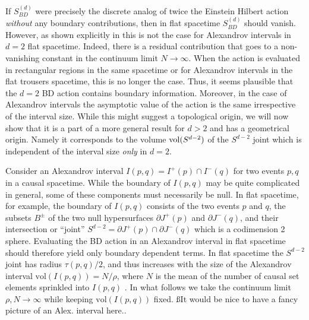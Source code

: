 \documentclass[12pt]{article}
\begin{document}
If $S_{BD}^{ (d)}$ were precisely the discrete analog of twice the Einstein Hilbert action {\it without} any boundary contributions, then in flat spacetime  $S_{BD}^{ (d)}$ should  vanish. However, as shown explicitly in \cite{bbdtwo} this is not the case for Alexandrov intervals in $d=2$  flat spacetime. Indeed, there is a residual contribution that goes to a non-vanishing constant in the continuum limit $N\rightarrow \infty$.  When the action is evaluated in rectangular regions in the same spacetime or for Alexandrov intervals in  the flat trousers spacetime, this is no longer the case. Thus, it seems plausible that the $d=2$ BD action contains boundary information. Moreover, in the case of Alexandrov intervals the asymptotic value of the action is the same  irrespective of the interval size. While this might suggest a  topological origin, we will now show that it is a part of a more general  result for $d>2$ and  has a geometrical origin. Namely it corresponds to the volume  $\mathrm{vol} (S^{d-2})$ of the $S^{d-2}$ joint which is independent of the interval size {\it only} in $d=2$.

Consider an Alexandrov interval $I (p,q)=I^+ (p) \cap I^- (q)$ for two events $p,q$ in a causal spacetime.   While the  boundary of $I (p,q)$ may be quite complicated in general, some of these components must necessarily be null.  In flat spacetime, for example,  the boundary of $I (p,q)$ consists of the two events $p$ and $q$, the subsets $B^\pm$ of the  two null hypersurfaces $\partial J^+ (p)$ and $\partial J^- (q)$, and their intersection or ``joint''  $S^{d-2}=\partial J^+ (p) \cap \partial J^- (q)$ which is a codimension 2 sphere.  Evaluating the BD action in an Alexandrov interval in flat spacetime should therefore yield  only boundary dependent terms.  In flat spacetime the $S^{d-2}$ joint  has radius $\tau (p,q)/2$, and thus increases with the size of the Alexandrov interval ${\mathrm{vol}} (I (p,q)) = N/\rho$, where $N$ is the mean of the number of causal set elements sprinkled into $I (p,q)$ . In what follows we take the continuum limit $\rho, N \rightarrow \infty$ while keeping ${\mathrm{vol}} (I (p,q))$ fixed. \ss{It would be nice to have a fancy picture of an Alex. interval here..}  
\end{document}
